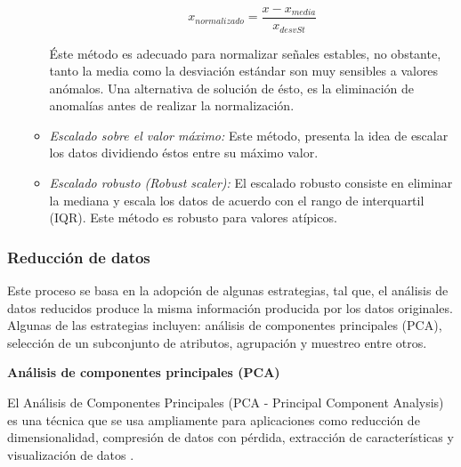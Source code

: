 \begin{itemize}
\begin{itemize}
\begin{equation}
x_{normalizado} = \frac{x - x_{media}}{x_{desvSt}}
\end{equation}

\'{E}ste m\'{e}todo es adecuado para normalizar se\~{n}ales estables, no obstante, tanto la media como la desviaci\'{o}n est\'{a}ndar son muy sensibles a valores an\'{o}malos. Una alternativa de soluci\'{o}n de \'{e}sto, es la eliminaci\'{o}n de anomal\'{i}as antes de realizar la normalizaci\'{o}n.

\item \textit{Escalado sobre el valor m\'{a}ximo: }Este m\'{e}todo, presenta la idea de escalar los datos dividiendo \'{e}stos entre su m\'{a}ximo valor.

\item \textit{Escalado robusto (Robust scaler): }El escalado robusto consiste en eliminar la mediana y escala los datos de acuerdo con el rango de interquartil (IQR). Este m\'{e}todo es robusto para valores at\'{i}picos.

\end{itemize}

\end{itemize}

\subsubsection{Reducci\'{o}n de datos}

Este proceso se basa en la adopci\'{o}n de algunas estrategias, tal que, el an\'{a}lisis de datos reducidos produce la misma informaci\'{o}n producida por los datos originales. Algunas de las estrategias incluyen: an\'{a}lisis de componentes principales (PCA), selecci\'{o}n de un subconjunto de atributos, agrupaci\'{o}n y muestreo entre otros.

\vspace{5mm} %

\textbf{An\'{a}lisis de componentes principales (PCA)}

\vspace{5mm} %

El An\'{a}lisis de Componentes Principales (PCA - Principal Component Analysis) es una técnica que se usa ampliamente para aplicaciones como reducción de dimensionalidad, compresión de datos con pérdida, extracción de características y visualización de datos \cite{39}.

\vspace{5mm} %

